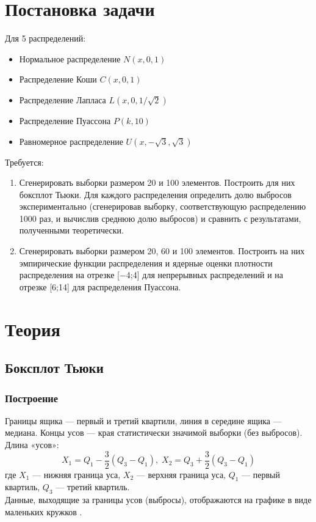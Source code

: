 \documentclass[12pt]{article}
\begin{document}
\section{Постановка задачи}
Для 5 распределений:
\begin{itemize}
    \item Нормальное распределение $N(x, 0, 1)$
    \item Распределение Коши $C(x, 0, 1)$
    \item Распределение Лапласа $L(x, 0, 1/\sqrt{2})$
    \item Распределение Пуассона $P(k, 10)$
    \item Равномерное распределение $U(x, -\sqrt{3}, \sqrt{3})$
\end{itemize}
Требуется:
\begin{enumerate}
    \item Сгенерировать выборки размером 20 и 100 элементов.
    Построить для них боксплот Тьюки. Для каждого распределения определить долю выбросов экспериментально (сгенерировав выборку, соответствующую распределению 1000 раз, и вычислив среднюю долю выбросов) и сравнить с результатами, полученными теоретически.
    \item Сгенерировать выборки размером 20, 60 и 100 элементов. Построить на них эмпирические функции распределения и ядерные оценки плотности распределения на отрезке [−4;4] для непрерывных распределений и на отрезке [6;14] для распределения Пуассона.
\end{enumerate}

\newpage

\section{Теория}
\subsection{Боксплот Тьюки}
\subsubsection{Построение}
Границы ящика — первый и третий квартили, линия в середине ящика — медиана. Концы усов — края статистически значимой выборки (без выбросов). Длина «усов»:
\begin{equation}
    X_1 = Q_1 - \frac{3}{2}(Q_3-Q_1),\; 
    X_2 = Q_3 + \frac{3}{2}(Q_3-Q_1)
    \label{x1x2}
\end{equation}
где $X_1$ — нижняя граница уса, $X_2$ — верхняя граница уса, $Q_1$ — первый
квартиль, $Q_3$ — третий квартиль.\\
Данные, выходящие за границы усов (выбросы), отображаются на графике
в виде маленьких кружков \cite{Box_plot}.\\
\end{document}
